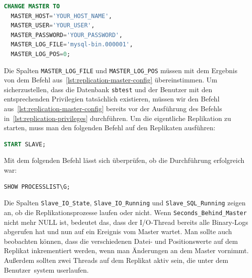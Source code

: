 \vspace{-8pt}
\begin{lstlisting}[language=SQL,caption=Verbindung des Replikats zum Master,label={lst:replication-connection-replica-master}]
CHANGE MASTER TO
  MASTER_HOST='YOUR_HOST_NAME',
  MASTER_USER='YOUR_USER',
  MASTER_PASSWORD='YOUR_PASSWORD',
  MASTER_LOG_FILE='mysql-bin.000001',
  MASTER_LOG_POS=0;
\end{lstlisting}
\vspace{-5pt}

Die Spalten \texttt{MASTER\_LOG\_FILE} und \texttt{MASTER\_LOG\_POS} müssen mit dem Ergebnis von dem Befehl aus~\ref{lst:replication-master-config} übereinstimmen.
Um sicherzustellen, dass die Datenbank \texttt{sbtest} und der Benutzer mit den entsprechenden Privilegien tatsächlich existieren, müssen wir den Befehl aus~\ref{lst:replication-master-config} bereits vor der Ausführung des Befehls in~\ref{lst:replication-privileges} durchführen.
Um die eigentliche Replikation zu starten, muss man den folgenden Befehl auf den Replikaten ausführen:

\vspace{-8pt}
\begin{lstlisting}[language=SQL,caption=Starten der Replikation,label={lst:replication-replica-start}]
START SLAVE;
\end{lstlisting}
\vspace{-5pt}

Mit dem folgenden Befehl lässt sich überprüfen, ob die Durchführung erfolgreich war:

\vspace{-8pt}
\begin{lstlisting}[language=SQL,caption=Status des Replikats,label={lst:replication-replica-status}]
SHOW PROCESSLIST\G;
\end{lstlisting}
\vspace{-5pt}

Die Spalten \texttt{Slave\_IO\_State}, \texttt{Slave\_IO\_Running} und \texttt{Slave\_SQL\_Running} zeigen an, ob die Replikationsprozesse laufen oder nicht.
Wenn \texttt{Seconds\_Behind\_Master} nicht mehr NULL ist, bedeutet das, dass der I/O-Thread bereits alle Binary-Logs abgerufen hat und nun auf ein Ereignis vom Master wartet.
Man sollte auch beobachten können, dass die verschiedenen Datei- und Positionswerte auf dem Replikat inkrementiert werden, wenn man Änderungen an dem Master vornimmt.
Außerdem sollten zwei Threads auf dem Replikat aktiv sein, die unter dem Benutzer~\glqq system user\grqq laufen.

